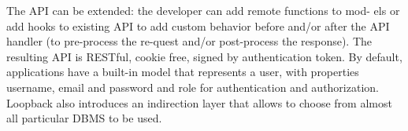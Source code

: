 The API can be extended: the developer can add remote functions to mod- els or add hooks to existing API to add custom behavior before and/or after the API handler (to pre-process the re-quest and/or post-process the response). The resulting API is RESTful, cookie free, signed by authentication token. By default, applications have a built-in model that represents a user, with properties username, email and password and role for authentication and authorization. Loopback also introduces an indirection layer that allows to choose from almost all particular DBMS to be used.

